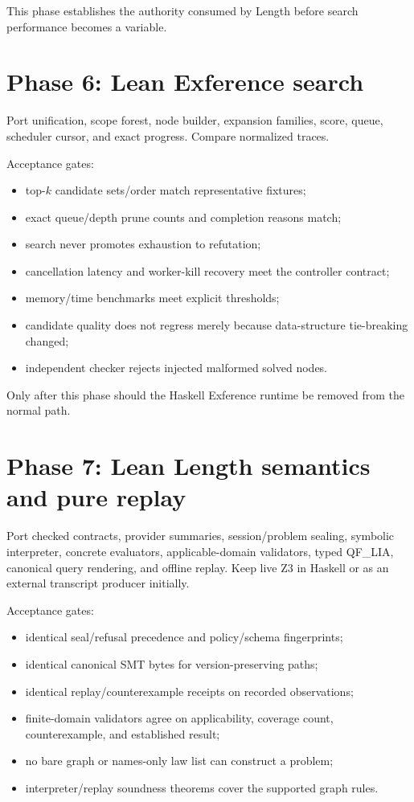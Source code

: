 \documentclass[10pt,letterpaper,oneside]{report}
\begin{document}
This phase establishes the authority consumed by Length before search performance becomes a variable.

\section{Phase 6: Lean Exference search}

Port unification, scope forest, node builder, expansion families, score, queue, scheduler cursor, and exact progress. Compare normalized traces.

Acceptance gates:

\begin{itemize}
  \item top-\(k\) candidate sets/order match representative fixtures;
  \item exact queue/depth prune counts and completion reasons match;
  \item search never promotes exhaustion to refutation;
  \item cancellation latency and worker-kill recovery meet the controller contract;
  \item memory/time benchmarks meet explicit thresholds;
  \item candidate quality does not regress merely because data-structure tie-breaking changed;
  \item independent checker rejects injected malformed solved nodes.
\end{itemize}

Only after this phase should the Haskell Exference runtime be removed from the normal path.

\section{Phase 7: Lean Length semantics and pure replay}

Port checked contracts, provider summaries, session/problem sealing, symbolic interpreter, concrete evaluators, applicable-domain validators, typed QF\_LIA, canonical query rendering, and offline replay. Keep live Z3 in Haskell or as an external transcript producer initially.

Acceptance gates:

\begin{itemize}
  \item identical seal/refusal precedence and policy/schema fingerprints;
  \item identical canonical SMT bytes for version-preserving paths;
  \item identical replay/counterexample receipts on recorded observations;
  \item finite-domain validators agree on applicability, coverage count, counterexample, and established result;
  \item no bare graph or names-only law list can construct a problem;
  \item interpreter/replay soundness theorems cover the supported graph rules.
\end{itemize}
\end{document}
